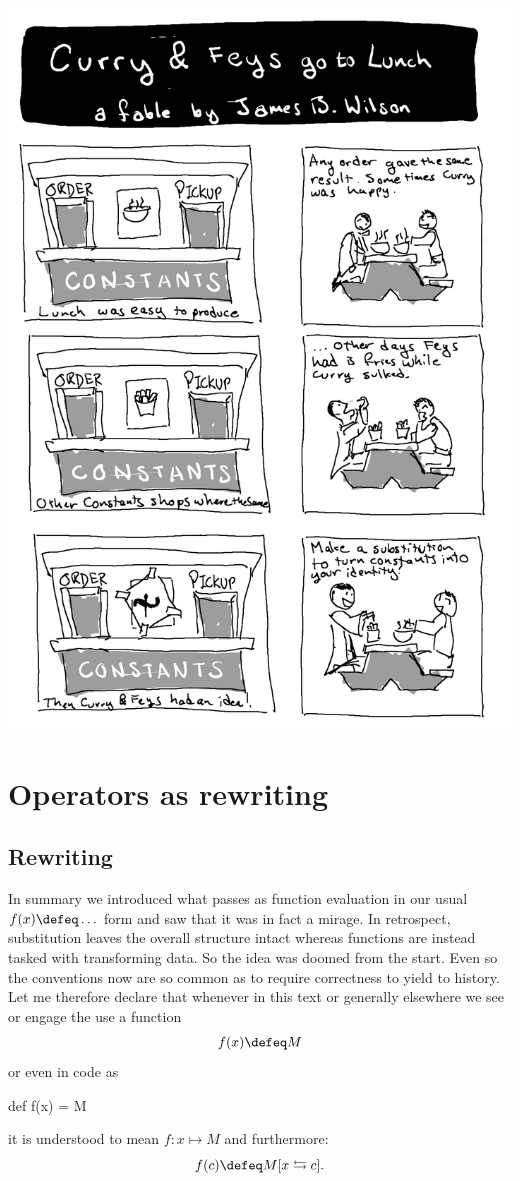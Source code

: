 
\cleardoublepage

\includegraphics[width=\textwidth]{curry-feys.png}

\chapter{Operators as rewriting}





% 

\section{Rewriting}
In summary we introduced what passes as function evaluation 
in our usual $f(x)\defeq \ldots$ form and saw that it was in fact 
a mirage.  In retrospect, substitution leaves the overall structure 
intact whereas functions are instead tasked with transforming data.
So the idea was doomed from the start.  Even so the conventions now 
are so common as to require correctness to yield to history.
Let me therefore declare that whenever in this text or generally 
elsewhere we see or engage the use a function
\[
    f(x)\defeq M
\]
or even in code as 
\begin{Pcode}[]
def f(x) = M
\end{Pcode}
it is understood to mean $f:x\mapsto M$ and furthermore:
\[
    f(c) \defeq M[x\leftrightarrows c].
\]

